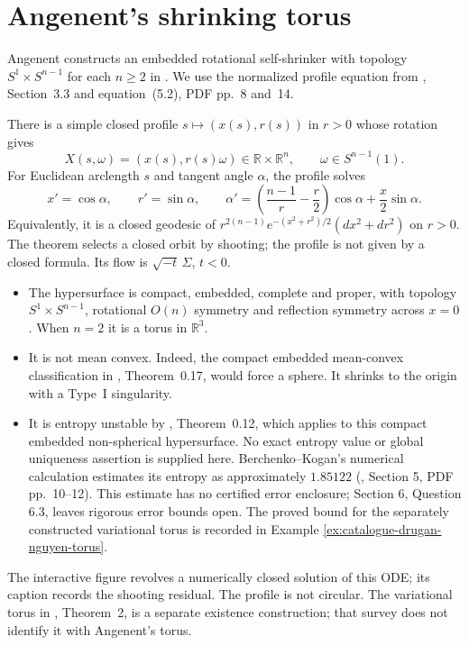 \chapter{Angenent's shrinking torus}\label{sec:catalogue-angenent-torus}
Angenent constructs an embedded rotational self-shrinker with topology
$S^1\times S^{n-1}$ for each $n\geq2$ in \cite{CatAngenent1992}.
We use the normalized profile equation from \cite{CatDLN2018},
Section~3.3 and equation~(5.2), PDF pp.~8 and~14.

\begin{example}\label{ex:catalogue-angenent-torus}
There is a simple closed profile $s\mapsto(x(s),r(s))$ in $r>0$ whose
rotation gives
\[
 X(s,\omega)=(x(s),r(s)\omega)\in\mathbb R\times\mathbb R^n,
 \qquad \omega\in S^{n-1}(1).
\]
For Euclidean arclength $s$ and tangent angle $\alpha$, the profile solves
\[
 x'=\cos\alpha,\qquad r'=\sin\alpha,\qquad
 \alpha'=\left(\frac{n-1}{r}-\frac r2\right)\cos\alpha
                +\frac x2\sin\alpha.
\]
Equivalently, it is a closed geodesic of
$r^{2(n-1)}e^{-(x^2+r^2)/2}(dx^2+dr^2)$ on $r>0$.
The theorem selects a closed orbit by shooting; the profile is not given
by a closed formula. Its flow is $\sqrt{-t}\,\Sigma$, $t<0$.
\begin{itemize}
\item The hypersurface is compact, embedded, complete and proper, with
topology $S^1\times S^{n-1}$, rotational $O(n)$ symmetry and reflection
symmetry across $x=0$. When $n=2$ it is a torus in $\mathbb R^3$.
\item It is not mean convex. Indeed, the compact embedded mean-convex
classification in \cite{CM12}, Theorem~0.17, would force a sphere.
It shrinks to the origin with a Type~I singularity.
\item It is entropy unstable by \cite{CM12}, Theorem~0.12,
which applies to this compact embedded non-spherical hypersurface.
No exact entropy value or global uniqueness assertion is supplied here. Berchenko--Kogan's numerical calculation estimates its entropy as approximately $1.85122$ (\cite{CatBerchenkoKogan2021}, Section 5, PDF pp.~10--12). This estimate has no certified error enclosure; Section 6, Question 6.3, leaves rigorous error bounds open. The proved bound for the separately constructed variational torus is recorded in Example \ref{ex:catalogue-drugan-nguyen-torus}.
\end{itemize}
The interactive figure revolves a numerically closed solution of this
ODE; its caption records the shooting residual. The profile is not circular.
The variational torus in \cite{CatDLN2018}, Theorem~2, is a separate
existence construction; that survey does not identify it with Angenent's torus.
\end{example}

